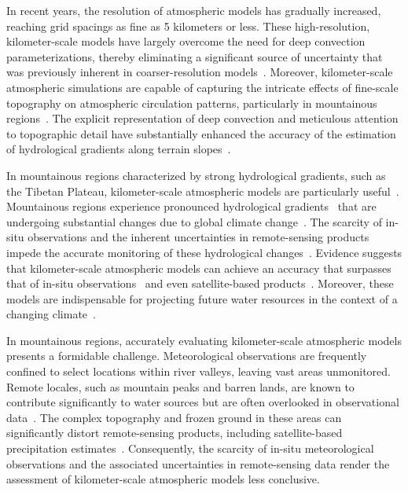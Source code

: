 \documentclass[draft]{agujournal2019}
\begin{document}
In recent years, the resolution of atmospheric models has gradually increased, reaching grid spacings as fine as 5 kilometers or less. These high-resolution, kilometer-scale models have largely overcome the need for deep convection parameterizations, thereby eliminating a significant source of uncertainty that was previously inherent in coarser-resolution models~\cite{prein2015RG, mooney2017JC}. Moreover, kilometer-scale atmospheric simulations are capable of capturing the intricate effects of fine-scale topography on atmospheric circulation patterns, particularly in mountainous regions~\cite{lin2018CD, zhou2021CD, yuan2023AR, sugimoto2021JHM, ma2023CD, li2022AAS}. The explicit representation of deep convection and meticulous attention to topographic detail have substantially enhanced the accuracy of the estimation of hydrological gradients along terrain slopes~\cite{jiang2022HESS, sugimoto2021JHM, ma2023CD}.

In mountainous regions characterized by strong hydrological gradients, such as the Tibetan Plateau, kilometer-scale atmospheric models are particularly useful~\cite{prein2023CD}. Mountainous regions experience pronounced hydrological gradients~\cite{immerzeel2014WRR} that are undergoing substantial changes due to global climate change~\cite{yao2019BAMS, cui2023NC, wang2021NCC, kraaijenbrink2021NCC}. The scarcity of in-situ observations and the inherent uncertainties in remote-sensing products impede the accurate monitoring of these hydrological changes~\cite{miao2024PNAS}. Evidence suggests that kilometer-scale atmospheric models can achieve an accuracy that surpasses that of in-situ observations~\cite{lundquist2019BAMS} and even satellite-based products~\cite{jiang2022IJC}. Moreover, these models are indispensable for projecting future water resources in the context of a changing climate~\cite{prein2023CD}.

In mountainous regions, accurately evaluating kilometer-scale atmospheric models presents a formidable challenge. Meteorological observations are frequently confined to select locations within river valleys, leaving vast areas unmonitored. Remote locales, such as mountain peaks and barren lands, are known to contribute significantly to water sources but are often overlooked in observational data~\cite{miao2024PNAS}. The complex topography and frozen ground in these areas can significantly distort remote-sensing products, including satellite-based precipitation estimates~\cite{behrangi2014JAMC}. Consequently, the scarcity of in-situ meteorological observations and the associated uncertainties in remote-sensing data render the assessment of kilometer-scale atmospheric models less conclusive.
\end{document}
